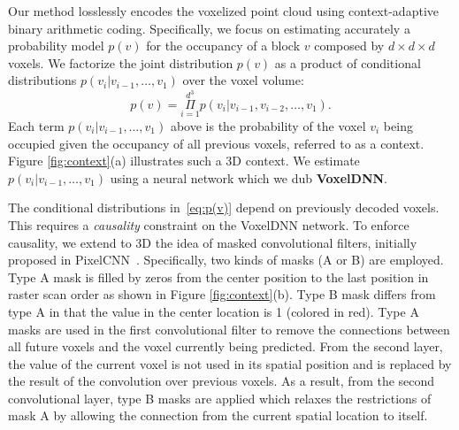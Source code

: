 \par Our method losslessly encodes the voxelized point cloud  using context-adaptive binary arithmetic coding. Specifically, we focus on estimating accurately a probability model $p(v)$  for the occupancy of a block $v$ composed by $d \times d \times d$ voxels. We factorize the joint distribution $p(v)$ as a product of conditional distributions $p(v_i|v_{i-1}, \ldots, v_1)$ over the voxel volume: 
\begin{equation}
    p(v)= \underset{i=1 }{\overset{d^3}{\Pi}}p(v_i|v_{i-1},v_{i-2},\ldots,v_{1}).
    \label{eq:p(v)}
\end{equation}
Each term $p(v_i|v_{i-1}, \ldots, v_1)$ above is the probability of the voxel $v_{i}$ being occupied given the occupancy of all previous voxels,  referred to as a context. Figure \ref{fig:context}(a) illustrates such a 3D context. We estimate $p(v_i|v_{i-1}, \ldots, v_1)$ using a neural network which we dub \textbf{VoxelDNN}.  

\par The conditional distributions in~\eqref{eq:p(v)} depend on previously decoded voxels. This requires a \textit{causality} constraint on the VoxelDNN network. To enforce causality, we extend to 3D the idea of masked convolutional filters, initially proposed in PixelCNN~\cite{oord2016pixel}. Specifically, two kinds of masks (A or B) are employed. Type A mask is filled by zeros from the center position to the last position in raster scan order as shown in Figure \ref{fig:context}(b). Type B mask differs from type A in that the value in the center location is 1 (colored in red). Type A masks are used in the first convolutional filter to remove the connections between all future voxels and the voxel currently being predicted. From the second layer, the value of the current voxel is not used in its spatial position and is replaced by the result of the convolution over previous voxels.  As a result, from the second convolutional layer, type B masks are applied which relaxes the restrictions of mask A by allowing the connection from the current spatial location to itself. 

